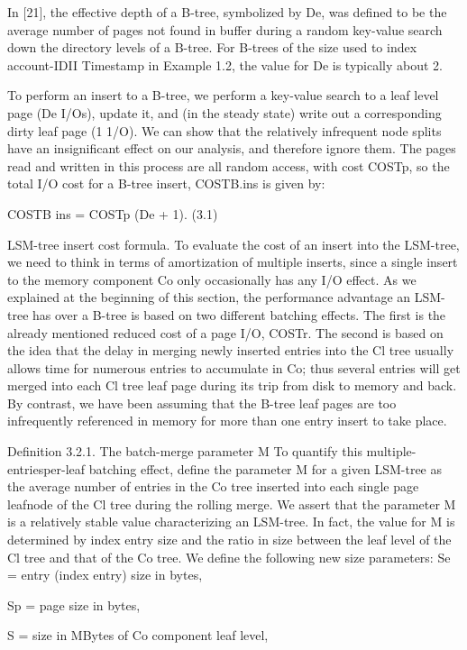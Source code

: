 \documentclass[a4paper,11pt,notitlepage,twoside,openright]{article}
\begin{document}
In {[}21{]}, the effective depth of a B-tree, symbolized by De, was
defined to be the average number of pages not found in buffer during a
random key-value search down the directory levels of a B-tree. For
B-trees of the size used to index account-IDII Timestamp in Example 1.2,
the value for De is typically about 2.

To perform an insert to a B-tree, we perform a key-value search to a
leaf level page (De I/Os), update it, and (in the steady state) write
out a corresponding dirty leaf page (1 1/O). We can show that the
relatively infrequent node splits have an insignificant effect on our
analysis, and therefore ignore them. The pages read and written in this
process are all random access, with cost COSTp, so the total I/O cost
for a B-tree insert, COSTB.ins is given by:


COSTB ins = COSTp (De + 1). (3.1)


LSM-tree insert cost formula. To evaluate the cost of an insert into the
LSM-tree, we need to think in terms of amortization of multiple inserts,
since a single insert to the memory component Co only occasionally has
any I/O effect. As we explained at the beginning of this section, the
performance advantage an LSM-tree has over a B-tree is based on two
different batching effects. The first is the already mentioned reduced
cost of a page I/O, COSTr. The second is based on the idea that the
delay in merging newly inserted entries into the Cl tree usually allows
time for numerous entries to accumulate in Co; thus several entries will
get merged into each Cl tree leaf page during its trip from disk to
memory and back. By contrast, we have been assuming that the B-tree leaf
pages are too infrequently referenced in memory for more than one entry
insert to take place.

Definition 3.2.1. The batch-merge parameter M To quantify this
multiple-entriesper-leaf batching effect, define the parameter M for a
given LSM-tree as the average number of entries in the Co tree inserted
into each single page leafnode of the Cl tree during the rolling merge.
We assert that the parameter M is a relatively stable value
characterizing an LSM-tree. In fact, the value for M is determined by
index entry size and the ratio in size between the leaf level of the Cl
tree and that of the Co tree. We define the following new size
parameters: Se = entry (index entry) size in bytes,

Sp = page size in bytes,

S = size in MBytes of Co component leaf level,
\end{document}

